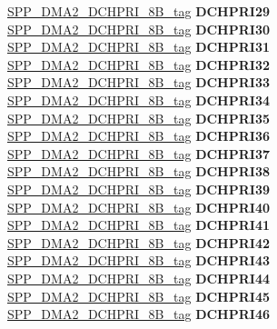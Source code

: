 \begin{DoxyCompactItemize}
\begin{tabbing}
\>\>\mbox{\hyperlink{unionSPP__DMA2__DCHPRI__8B__tag}{SPP\_DMA2\_DCHPRI\_8B\_tag}} {\bfseries DCHPRI29}\\
\>\>\mbox{\hyperlink{unionSPP__DMA2__DCHPRI__8B__tag}{SPP\_DMA2\_DCHPRI\_8B\_tag}} {\bfseries DCHPRI30}\\
\>\>\mbox{\hyperlink{unionSPP__DMA2__DCHPRI__8B__tag}{SPP\_DMA2\_DCHPRI\_8B\_tag}} {\bfseries DCHPRI31}\\
\>\>\mbox{\hyperlink{unionSPP__DMA2__DCHPRI__8B__tag}{SPP\_DMA2\_DCHPRI\_8B\_tag}} {\bfseries DCHPRI32}\\
\>\>\mbox{\hyperlink{unionSPP__DMA2__DCHPRI__8B__tag}{SPP\_DMA2\_DCHPRI\_8B\_tag}} {\bfseries DCHPRI33}\\
\>\>\mbox{\hyperlink{unionSPP__DMA2__DCHPRI__8B__tag}{SPP\_DMA2\_DCHPRI\_8B\_tag}} {\bfseries DCHPRI34}\\
\>\>\mbox{\hyperlink{unionSPP__DMA2__DCHPRI__8B__tag}{SPP\_DMA2\_DCHPRI\_8B\_tag}} {\bfseries DCHPRI35}\\
\>\>\mbox{\hyperlink{unionSPP__DMA2__DCHPRI__8B__tag}{SPP\_DMA2\_DCHPRI\_8B\_tag}} {\bfseries DCHPRI36}\\
\>\>\mbox{\hyperlink{unionSPP__DMA2__DCHPRI__8B__tag}{SPP\_DMA2\_DCHPRI\_8B\_tag}} {\bfseries DCHPRI37}\\
\>\>\mbox{\hyperlink{unionSPP__DMA2__DCHPRI__8B__tag}{SPP\_DMA2\_DCHPRI\_8B\_tag}} {\bfseries DCHPRI38}\\
\>\>\mbox{\hyperlink{unionSPP__DMA2__DCHPRI__8B__tag}{SPP\_DMA2\_DCHPRI\_8B\_tag}} {\bfseries DCHPRI39}\\
\>\>\mbox{\hyperlink{unionSPP__DMA2__DCHPRI__8B__tag}{SPP\_DMA2\_DCHPRI\_8B\_tag}} {\bfseries DCHPRI40}\\
\>\>\mbox{\hyperlink{unionSPP__DMA2__DCHPRI__8B__tag}{SPP\_DMA2\_DCHPRI\_8B\_tag}} {\bfseries DCHPRI41}\\
\>\>\mbox{\hyperlink{unionSPP__DMA2__DCHPRI__8B__tag}{SPP\_DMA2\_DCHPRI\_8B\_tag}} {\bfseries DCHPRI42}\\
\>\>\mbox{\hyperlink{unionSPP__DMA2__DCHPRI__8B__tag}{SPP\_DMA2\_DCHPRI\_8B\_tag}} {\bfseries DCHPRI43}\\
\>\>\mbox{\hyperlink{unionSPP__DMA2__DCHPRI__8B__tag}{SPP\_DMA2\_DCHPRI\_8B\_tag}} {\bfseries DCHPRI44}\\
\>\>\mbox{\hyperlink{unionSPP__DMA2__DCHPRI__8B__tag}{SPP\_DMA2\_DCHPRI\_8B\_tag}} {\bfseries DCHPRI45}\\
\>\>\mbox{\hyperlink{unionSPP__DMA2__DCHPRI__8B__tag}{SPP\_DMA2\_DCHPRI\_8B\_tag}} {\bfseries DCHPRI46}\\

\end{tabbing}
\end{DoxyCompactItemize}
